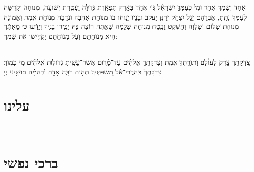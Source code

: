 \documentclass[twoside, openany, parskip=half, 11pt]{book}
\begin{document}
\sepline

\shabboskiddushhashem

 אֶחָד וְשִׁמְךָ אֶחָד  וּמִי֙ כְּעַמְּךָ֣ יִשְׂרָאֵ֔ל גּ֥וֹי אֶחָ֖ד בָּאָ֑רֶץ תִּפְאֶֽרֶת גְּדֻלָּה וַעֲטֶֽרֶת יְשׁוּעָה, מְנוּחָה וּקְדֻשָּׁה לְעַמְּֿךָ נָתַֽתָּ, אַבְרָהָם יָגֵל יִצְחָק יְרַנֵּן יַעֲקֹב וּבָנָיו יָנֽוּחוּ בוֹ מְנוּחַת אַהֲבָה וּנְדָבָה מְנוּחַת אֱמֶת וֶאֱמוּנָה מְנוּחַת שָׁלוֹם וְשַׁלְוָה וְהַשְׁקֵט וָבֶֽטַח מְנוּחָה שְׁלֵמָה שָׁאַתָּה רוֹצֶה בָּהּ יַכִּֽירוּ בָנֶֽיךָ וְיֵדְֿעוּ כִּי מֵאִתְּֿךָ הִיא מְנוּחָתָם וְעַל מְנוּחָתָם יַקְדִּֽישׁוּ אֶת שְׁמֶֽךָ:
 
\shabboskiddushhayom

\retzeh

\yaalehveyavo

\zion

\modim

\shabboschanukah

\shabboshodos

\shabbossimshalom

\tachanunim

\\
 צִ֭דְקָֽתְֿךָ צֶ֥דֶק לְעוֹ֗לָם וְתוֹרָֽתְךָ֥ אֱמֶֽת׃
וְצִדְקָֽתְֿךָ֥ אֱלֹהִ֗ים עַד־מָ֫ר֥וֹם אֲשֶׁר־עָשִׂ֥יתָ גְדוֹל֑וֹת אֱ֝לֹהִ֗ים מִ֣י כָמֽוֹךָ׃
 צִדְקָֽתְֿךָ֙ כְּֽהַרֲרֵי־אֵ֗ל מִ֭שְׁפָּטֶיךָ תְּה֣וֹם רַבָּ֑ה אָדָ֥ם וּ֜בְהֵמָ֗ה תּוֹשִׁ֥יעַ יְיָ׃

\fullkaddish

\section*{ עלינו }

\aleinu

\\
 \pageref{avos}

\section*{ ברכי נפשי }
\end{document}
